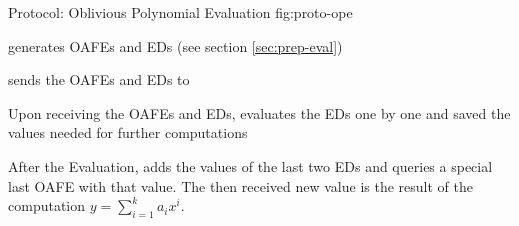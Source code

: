 \begin{JWprotocol}%
  {\JWprotoSymOPE}%
  {Protocol: Oblivious Polynomial Evaluation}%
  {fig:proto-ope}


  \begin{JWprotoSteps}

  \item \JWpOne{} generates OAFEs and EDs (see section \ref{sec:prep-eval})

  \item \JWpOne{} sends the OAFEs and EDs to \JWpTwo{}

  \end{JWprotoSteps}



  \begin{JWprotoSteps}

  \item Upon receiving the OAFEs and EDs, \JWpTwo{} evaluates the EDs one by one
    and saved the values needed for further computations

  \item After the Evaluation, \JWpTwo{} adds the values of the last two EDs and
    queries a special last OAFE with that value. The then received new value is
    the result of the computation $y = \sum_{i=1}^k a_ix^i$.

  \end{JWprotoSteps}

\end{JWprotocol}
